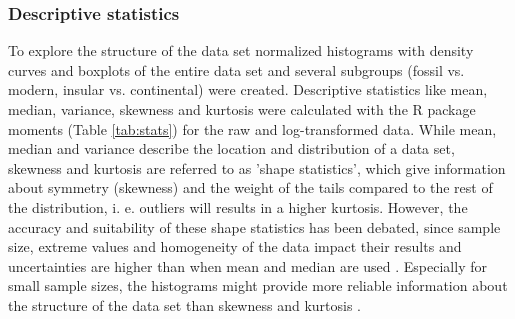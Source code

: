 



\subsubsection{Descriptive statistics}
To explore the structure of the data set normalized histograms with density curves and boxplots of the entire data set and several subgroups (fossil vs. modern, insular vs. continental) were created. Descriptive statistics like mean, median, variance, skewness and kurtosis were calculated with the R package moments \citep{Komsta2015}  (Table \ref{tab:stats}) for the raw and log-transformed data. While mean, median and variance describe the location and distribution of a data set, skewness and kurtosis are referred to as 'shape statistics', which give information about symmetry (skewness) and the weight of the tails compared to the rest of the distribution, i. e. outliers will results in a higher kurtosis. However, the accuracy and suitability of these shape statistics has been debated, since sample size, extreme values and homogeneity of the data impact their results and uncertainties are higher than when mean and median are used \citep{McNeese2016, Bai2005}. Especially for small sample sizes, the histograms might provide more reliable information about the structure of the data set than skewness and kurtosis \citep{McNeese2016}.

